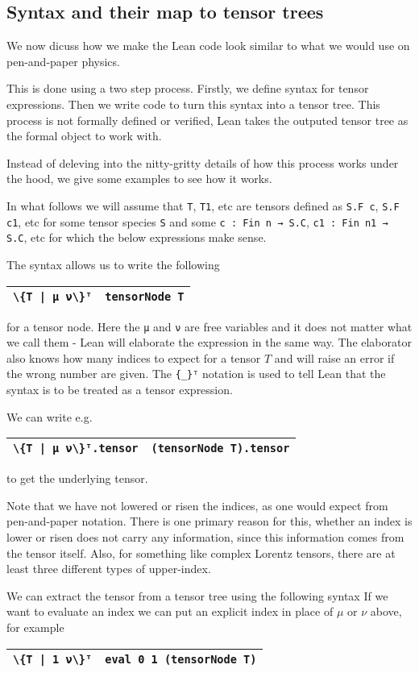 \documentclass[a4paper, 11pt]{article}
\newcommand{\syntaxElab}[2]{ 
  \arrayrulecolor{mycolor}
  \begin{center}
    \begin{tabular}{|p{1.7in} | p{4in}|}
    \hline
    \hfill {#1} & {#2} \\
    \hline
    \end{tabular}
    \end{center}
  \arrayrulecolor{black}
}
\begin{document}
\subsection{Syntax and their map to tensor trees}


We now dicuss how we make the Lean code look similar to what we would use on pen-and-paper physics. 

This is done using a two step process. Firstly, we define syntax for tensor expressions. 
Then we write code to turn this syntax into a tensor tree. This process is not formally defined or 
verified, Lean takes the outputed tensor tree as the formal object to work with.

Instead of deleving into the nitty-gritty details of how this process works under the hood, 
we give some examples to see how it works. 

In what follows we will assume that \lstinline|T|, \lstinline|T1|, etc are tensors defined as 
\lstinline|S.F c|, \lstinline|S.F c1|, etc for 
some tensor species \lstinline|S| and some \lstinline|c : Fin n → S.C|, \lstinline|c1 : Fin n1 → S.C|, etc 
for which the below expressions make sense.

The syntax allows us to write the following 
\syntaxElab{\lstinline!\{T | μ ν\}ᵀ!}{{\lstinline!tensorNode T!}}
for a tensor node. Here the \lstinline|μ| and \lstinline|ν| are free variables and it does not 
matter what we call them - Lean will elaborate the expression in the same way.
The elaborator also knows how many indices to expect for a tensor $T$ and will raise an error if
the wrong number are given. The \lstinline|{_}ᵀ| notation is used to tell Lean that the syntax
is to be treated as a tensor expression. 

We can write e.g. 
\syntaxElab{\lstinline!\{T | μ ν\}ᵀ.tensor!}{{\lstinline!(tensorNode T).tensor!}}
to get the underlying tensor.

Note that we have not lowered or risen the indices, as one would expect from pen-and-paper notation.
There is one primary reason for this, whether an index is lower or risen does not carry any information, 
since this information comes from the tensor itself. Also, for something like complex Lorentz tensors, 
there are at least three different types of upper-index. 

We can extract the tensor from a tensor tree using the following syntax
If we want to evaluate an index we can put an explicit index in place of $\mu$ or $\nu$ above, 
for example
\syntaxElab{\lstinline!\{T | 1 ν\}ᵀ!}{\lstinline!eval 0 1 (tensorNode T)!}
\end{document}
